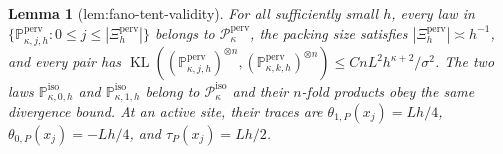 \documentclass{article}
\newtheorem{lemma}{Lemma}
\begin{document}
\begin{lemma}[lem:fano-tent-validity]\label{lem:fano-tent-validity}
For all sufficiently small \(h\), every law in \(\{\mathbb P_{\kappa,j,h}^{\mathrm{perv}}:0\le j\le|\Xi_h^{\mathrm{perv}}|\}\) belongs to \(\mathcal P_{\kappa}^{\mathrm{perv}}\), the packing size satisfies \(|\Xi_h^{\mathrm{perv}}|\asymp h^{-1}\), and every pair has \(\operatorname{KL}((\mathbb P_{\kappa,j,h}^{\mathrm{perv}})^{\otimes n},(\mathbb P_{\kappa,k,h}^{\mathrm{perv}})^{\otimes n})\le CnL^2h^{\kappa+2}/\sigma^2\). The two laws \(\mathbb P_{\kappa,0,h}^{\mathrm{iso}}\) and \(\mathbb P_{\kappa,1,h}^{\mathrm{iso}}\) belong to \(\mathcal P_{\kappa}^{\mathrm{iso}}\) and their \(n\)-fold products obey the same divergence bound. At an active site, their traces are \(\theta_{1,P}(x_j)=Lh/4\), \(\theta_{0,P}(x_j)=-Lh/4\), and \(\tau_P(x_j)=Lh/2\).
\end{lemma}
\end{document}
